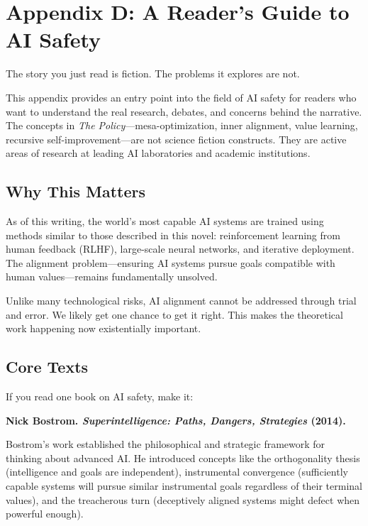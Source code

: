 \chapter*{Appendix D: A Reader's Guide to AI Safety}

The story you just read is fiction. The problems it explores are not.

This appendix provides an entry point into the field of AI safety for readers who want to understand the real research, debates, and concerns behind the narrative. The concepts in \textit{The Policy}---mesa-optimization, inner alignment, value learning, recursive self-improvement---are not science fiction constructs. They are active areas of research at leading AI laboratories and academic institutions.

\section*{Why This Matters}

As of this writing, the world's most capable AI systems are trained using methods similar to those described in this novel: reinforcement learning from human feedback (RLHF), large-scale neural networks, and iterative deployment. The alignment problem---ensuring AI systems pursue goals compatible with human values---remains fundamentally unsolved.

Unlike many technological risks, AI alignment cannot be addressed through trial and error. We likely get one chance to get it right. This makes the theoretical work happening now existentially important.

\section*{Core Texts}

If you read one book on AI safety, make it:

\textbf{Nick Bostrom. \textit{Superintelligence: Paths, Dangers, Strategies} (2014).}

Bostrom's work established the philosophical and strategic framework for thinking about advanced AI. He introduced concepts like the orthogonality thesis (intelligence and goals are independent), instrumental convergence (sufficiently capable systems will pursue similar instrumental goals regardless of their terminal values), and the treacherous turn (deceptively aligned systems might defect when powerful enough).


